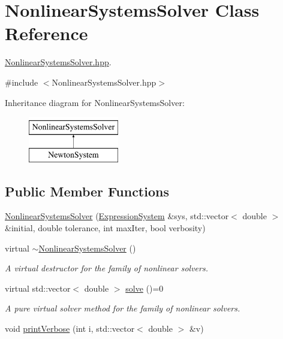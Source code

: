 \hypertarget{class_nonlinear_systems_solver}{}\section{Nonlinear\+Systems\+Solver Class Reference}
\label{class_nonlinear_systems_solver}


\hyperlink{_nonlinear_systems_solver_8hpp_source}{Nonlinear\+Systems\+Solver.\+hpp}.  




{\ttfamily \#include $<$Nonlinear\+Systems\+Solver.\+hpp$>$}

Inheritance diagram for Nonlinear\+Systems\+Solver\+:\begin{figure}[H]
\begin{center}
\leavevmode
\includegraphics[height=2.000000cm]{class_nonlinear_systems_solver}
\end{center}
\end{figure}
\subsection*{Public Member Functions}
\begin{DoxyCompactItemize}
\item 
\hyperlink{class_nonlinear_systems_solver_a39b82503490941b7972fde0cfbd28ca0}{Nonlinear\+Systems\+Solver} (\hyperlink{class_expression_system}{Expression\+System} \&sys, std\+::vector$<$ double $>$ \&initial, double tolerance, int max\+Iter, bool verbosity)
\item 
virtual \hyperlink{class_nonlinear_systems_solver_a7a2bc7ca31192bf419d595abd887bd11}{$\sim$\+Nonlinear\+Systems\+Solver} ()\hypertarget{class_nonlinear_systems_solver_a7a2bc7ca31192bf419d595abd887bd11}{}\label{class_nonlinear_systems_solver_a7a2bc7ca31192bf419d595abd887bd11}

\begin{DoxyCompactList}\small\item\em A virtual destructor for the family of nonlinear solvers. \end{DoxyCompactList}\item 
virtual std\+::vector$<$ double $>$ \hyperlink{class_nonlinear_systems_solver_a9067a4fa26bce4b2aa359cfccd93c84f}{solve} ()=0\hypertarget{class_nonlinear_systems_solver_a9067a4fa26bce4b2aa359cfccd93c84f}{}\label{class_nonlinear_systems_solver_a9067a4fa26bce4b2aa359cfccd93c84f}

\begin{DoxyCompactList}\small\item\em A pure virtual solver method for the family of nonlinear solvers. \end{DoxyCompactList}\item 
void \hyperlink{class_nonlinear_systems_solver_ad071f60a5c0e9d714450ff71942891f4}{print\+Verbose} (int i, std\+::vector$<$ double $>$ \&v)
\end{DoxyCompactItemize}
